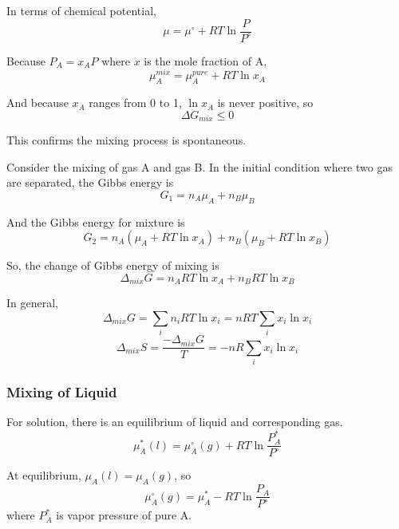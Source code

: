 \documentclass[letterpaper]{article}
\newcommand{\zero}{^\circ}
\begin{document}
In terms of chemical potential,
\begin{equation*}
    \mu=\mu\zero+RT\ln\frac{P}{P\zero}
\end{equation*}

Because $P_A=x_AP$ where $x$ is the mole fraction of A,
\begin{equation*}
    \mu_A^{mix}=\mu_A^{pure}+RT\ln x_A
\end{equation*}

And because $x_A$ ranges from 0 to 1, $\ln x_A$ is never positive, so
\begin{equation*}
    \Delta G_{mix}\leq 0
\end{equation*}

This confirms the mixing process is spontaneous.

Consider the mixing of gas A and gas B. In the initial condition where two gas are separated,
the Gibbs energy is
\begin{equation*}
    G_1=n_A\mu_A+n_B\mu_B
\end{equation*}

And the Gibbs energy for mixture is
\begin{equation*}
    G_2=n_A\left(\mu_A+RT\ln x_A\right)+n_B\left(\mu_B+RT\ln x_B\right)
\end{equation*}

So, the change of Gibbs energy of mixing is
\begin{equation*}
    \Delta_{mix}G=n_ART\ln x_A+n_BRT\ln x_B
\end{equation*}

In general,
\begin{equation*}
    \Delta_{mix}G=\sum_in_iRT\ln x_i=nRT\sum_ix_i\ln x_i
\end{equation*}
\begin{equation*}
    \Delta_{mix}S=\frac{-\Delta_{mix}G}{T}=-nR\sum_ix_i\ln x_i
\end{equation*}
\subsubsection*{Mixing of Liquid}
For solution, there is an equilibrium of liquid and corresponding gas.
\begin{equation*}
    \mu_A^*(l)=\mu_A\zero\left(g\right)+RT\ln\frac{P_A^*}{P\zero}
\end{equation*}

At equilibrium, $\mu_A(l)=\mu_A\left(g\right)$, so
\begin{equation*}
    \mu_A\zero\left(g\right)=\mu_A^*-RT\ln\frac{P_A}{P\zero}
\end{equation*}
where $P_A^*$ is vapor pressure of pure A.
\end{document}
